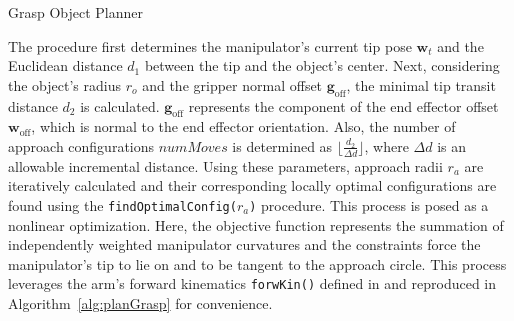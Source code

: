 \begin{algorithm}[!htbp]
\begin{small}
{  \KwRet{$\boldsymbol{\kappa}^*$} \; }
  \setcounter{AlgoLine}{0}
  \caption{Grasp Object Planner}
  \label{alg:planGrasp}
\end{small}

\end{algorithm}

The procedure first determines the manipulator's current tip pose $\mathbf{w}_t$ and the Euclidean distance $d_1$ between the tip and the object's center. 
Next, considering the object's radius $r_o$ and the gripper normal offset $\mathbf{g}_{\textrm{off}}$, the minimal tip transit distance $d_2$ is calculated. 
 $\mathbf{g}_{\textrm{off}}$ represents the component of the end effector offset $\mathbf{w}_{\textrm{off}}$, which is normal to the end effector orientation. 
Also, the number of approach configurations $numMoves$ is determined as $\lfloor \frac{d_2}{\Delta d} \rfloor$, where $\Delta d$ is an allowable incremental distance. 
Using these parameters, approach radii $r_a$ are iteratively calculated and their corresponding locally optimal configurations are found using the \texttt{findOptimalConfig($r_a$)} procedure. 
This process is posed as a nonlinear optimization. 
Here, the objective function represents the summation of independently weighted manipulator curvatures and the constraints force the manipulator's tip to lie on and to be tangent to the approach circle. 
This process leverages the arm's forward kinematics \texttt{forwKin()} defined in \cite{marchese2014design} and reproduced in Algorithm~\ref{alg:planGrasp} for convenience. 

